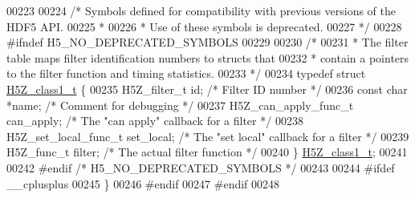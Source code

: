 \begin{DoxyCode}
00223 
00224 \textcolor{comment}{/* Symbols defined for compatibility with previous versions of the HDF5 API.}
00225 \textcolor{comment}{ *}
00226 \textcolor{comment}{ * Use of these symbols is deprecated.}
00227 \textcolor{comment}{ */}
00228 \textcolor{preprocessor}{#ifndef H5\_NO\_DEPRECATED\_SYMBOLS}
00229 
00230 \textcolor{comment}{/*}
00231 \textcolor{comment}{ * The filter table maps filter identification numbers to structs that}
00232 \textcolor{comment}{ * contain a pointers to the filter function and timing statistics.}
00233 \textcolor{comment}{ */}
00234 \textcolor{keyword}{typedef} \textcolor{keyword}{struct }\hyperlink{struct_h5_z__class1__t}{H5Z\_class1\_t} \{
00235     H5Z\_filter\_t id;        \textcolor{comment}{/* Filter ID number              */}
00236     \textcolor{keyword}{const} \textcolor{keywordtype}{char}  *name;      \textcolor{comment}{/* Comment for debugging             */}
00237     H5Z\_can\_apply\_func\_t can\_apply; \textcolor{comment}{/* The "can apply" callback for a filter */}
00238     H5Z\_set\_local\_func\_t set\_local; \textcolor{comment}{/* The "set local" callback for a filter */}
00239     H5Z\_func\_t filter;      \textcolor{comment}{/* The actual filter function            */}
00240 \} \hyperlink{struct_h5_z__class1__t}{H5Z\_class1\_t};
00241 
00242 \textcolor{preprocessor}{#endif }\textcolor{comment}{/* H5\_NO\_DEPRECATED\_SYMBOLS */}\textcolor{preprocessor}{}
00243 
00244 \textcolor{preprocessor}{#ifdef \_\_cplusplus}
00245 \}
00246 \textcolor{preprocessor}{#endif}
00247 \textcolor{preprocessor}{#endif}
00248 
\end{DoxyCode}
